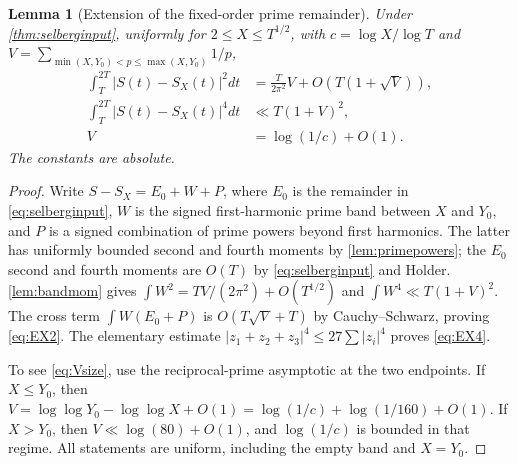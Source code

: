 \documentclass[11pt,reqno]{amsart}
\numberwithin{equation}{section}
\newtheorem{lemma}[theorem]{Lemma}
\begin{document}
\begin{lemma}[Extension of the fixed-order prime remainder]\label{lem:approxextension}
Under \cref{thm:selberginput}, uniformly for $2\le X\le T^{1/2}$,
with $c=\log X/\log T$ and $V=\sum_{\min(X,Y_0)<p\le\max(X,Y_0)}1/p$,
\begin{align}
\int_T^{2T}|S(t)-S_X(t)|^2dt
 &=\frac{T}{2\pi^2}V+O(T(1+\sqrt V)),\label{eq:EX2}\\
\int_T^{2T}|S(t)-S_X(t)|^4dt
 &\ll T(1+V)^2,\label{eq:EX4}\\
V&=\log(1/c)+O(1).\label{eq:Vsize}
\end{align}
The constants are absolute.
\end{lemma}
\begin{proof}
Write $S-S_X=E_0+W+P$, where $E_0$ is the remainder
in \eqref{eq:selberginput}, $W$ is the signed first-harmonic
prime band between $X$ and $Y_0$, and $P$ is a signed combination
of prime powers beyond first harmonics.  The latter has
uniformly bounded second and fourth moments by
\cref{lem:primepowers}; the $E_0$ second and fourth moments
are $O(T)$ by \eqref{eq:selberginput} and Holder.
\cref{lem:bandmom} gives $\int W^2=T V/(2\pi^2)+O(T^{1/2})$
and $\int W^4\ll T(1+V)^2$.  The cross term
$\int W(E_0+P)$ is $O(T\sqrt V+T)$ by Cauchy--Schwarz,
proving \eqref{eq:EX2}.  The elementary estimate
$|z_1+z_2+z_3|^4\le27\sum|z_i|^4$ proves
\eqref{eq:EX4}.

To see \eqref{eq:Vsize}, use the reciprocal-prime asymptotic
at the two endpoints.  If $X\le Y_0$, then
$V=\log\log Y_0-\log\log X+O(1)
 =\log(1/c)+\log(1/160)+O(1)$.
If $X>Y_0$, then $V\ll\log(80)+O(1)$, and
$\log(1/c)$ is bounded in that regime.
All statements are uniform, including the empty band and $X=Y_0$.
\end{proof}
\end{document}
